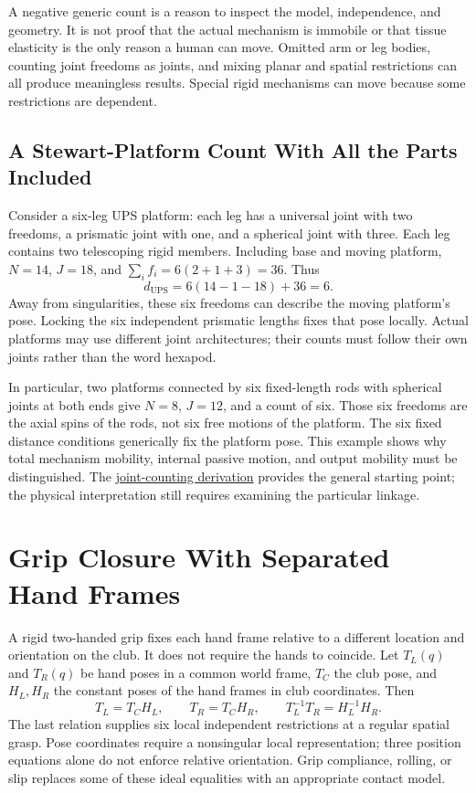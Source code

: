 A negative generic count is a reason to inspect the model, independence, and
geometry. It is not proof that the actual mechanism is immobile or that tissue
elasticity is the only reason a human can move. Omitted arm or leg bodies,
counting joint freedoms as joints, and mixing planar and spatial restrictions
can all produce meaningless results. Special rigid mechanisms can move because
some restrictions are dependent.

\subsection{A Stewart-Platform Count With All the Parts Included}

Consider a six-leg UPS platform: each leg has a universal joint with two
freedoms, a prismatic joint with one, and a spherical joint with three. Each
leg contains two telescoping rigid members. Including base and moving platform,
$N=14$, $J=18$, and $\sum_i f_i=6(2+1+3)=36$. Thus
\begin{equation}
 d_{\mathrm{UPS}}=6(14-1-18)+36=6.
 \label{eq:stewart_mobility}
\end{equation}
Away from singularities, these six freedoms can describe the moving platform's
pose. Locking the six independent prismatic lengths fixes that pose locally.
Actual platforms may use different joint architectures; their counts must follow
their own joints rather than the word hexapod.

In particular, two platforms connected by six fixed-length rods with spherical
joints at both ends give $N=8$, $J=12$, and a count of six. Those six freedoms
are the axial spins of the rods, not six free motions of the platform. The six
fixed distance conditions generically fix the platform pose. This example shows
why total mechanism mobility, internal passive motion, and output mobility must
be distinguished. The
\href{https://modernrobotics.northwestern.edu/nu-gm-book-resource/2-2-degrees-of-freedom-of-a-robot/}{joint-counting derivation}
provides the general starting point; the physical interpretation still requires
examining the particular linkage.

\section{Grip Closure With Separated Hand Frames}
\label{sec:grip_parallel_constraint}

A rigid two-handed grip fixes each hand frame relative to a different location
and orientation on the club. It does not require the hands to coincide. Let
$T_L(q)$ and $T_R(q)$ be hand poses in a common world frame, $T_C$ the club pose,
and $H_L,H_R$ the constant poses of the hand frames in club coordinates. Then
\begin{equation}
 T_L=T_C H_L,\qquad T_R=T_C H_R,\qquad
 T_L^{-1}T_R=H_L^{-1}H_R.
 \label{eq:grip_spatial_constraint}
\end{equation}
The last relation supplies six local independent restrictions at a regular
spatial grasp. Pose coordinates require a nonsingular local representation;
three position equations alone do not enforce relative orientation. Grip
compliance, rolling, or slip replaces some of these ideal equalities with an
appropriate contact model.

